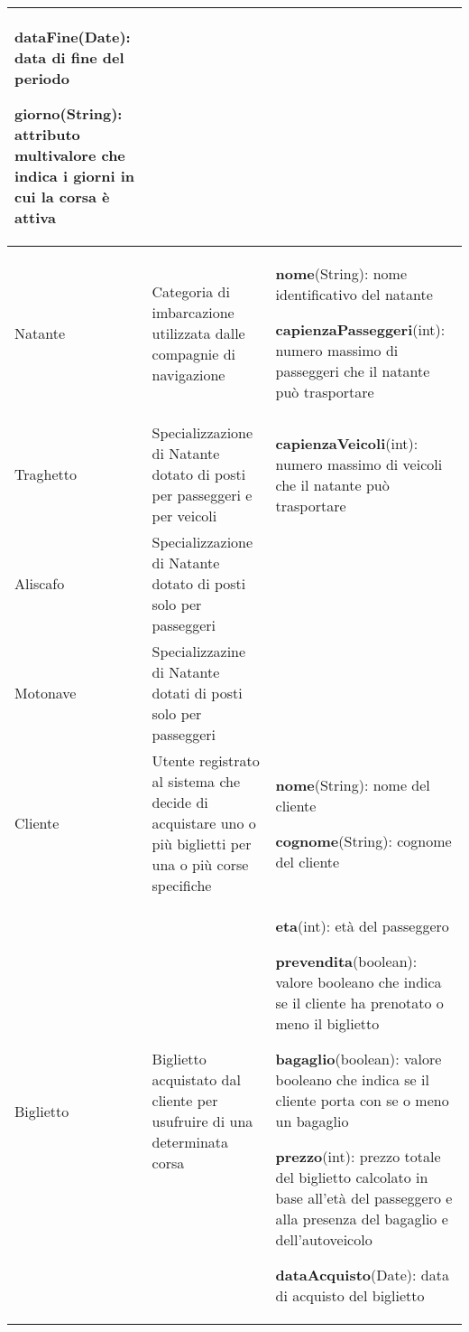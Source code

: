 \begin{longtable}{|| m{} | m{} | m{} ||}
     \textbf{dataFine}(Date): data di fine del periodo
     
     \textbf{giorno}(String): attributo multivalore che indica i giorni in cui la corsa è attiva\\
     \hline
    
     Natante & Categoria di imbarcazione utilizzata dalle compagnie di navigazione &
     \textbf{nome}(String): nome identificativo del natante
     
     \textbf{capienzaPasseggeri}(int): numero massimo di passeggeri che il natante può trasportare\\
     \hline

     Traghetto & Specializzazione di Natante dotato di posti per passeggeri e per veicoli &
     \textbf{capienzaVeicoli}(int): numero massimo di veicoli che il natante può trasportare\\
     \hline

     Aliscafo & Specializzazione di Natante dotato di posti solo per passeggeri &
     \\
     \hline

     Motonave & Specializzazine di Natante dotati di posti solo per passeggeri &
     \\
     \hline

     Cliente & Utente registrato al sistema che decide di acquistare uno o più biglietti per una o più corse specifiche &
     \textbf{nome}(String): nome del cliente
     
     \textbf{cognome}(String): cognome del cliente\\
     \hline

     Biglietto & Biglietto acquistato dal cliente per usufruire di una determinata corsa &
     \textbf{eta}(int): età del passeggero
     
     \textbf{prevendita}(boolean): valore booleano che indica se il cliente ha prenotato o meno il biglietto
     
     \textbf{bagaglio}(boolean): valore booleano che indica se il cliente porta con se o meno un bagaglio
     
     \textbf{prezzo}(int): prezzo totale del biglietto calcolato in base all'età del passeggero e alla presenza del bagaglio e dell'autoveicolo
     
     \textbf{dataAcquisto}(Date): data di acquisto del biglietto\\
     \hline


\end{longtable}
